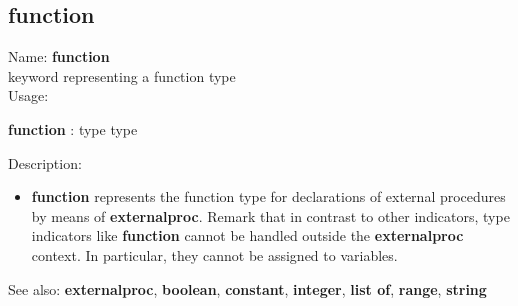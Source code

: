 \subsection{ function }
\noindent Name: \textbf{function}\\
keyword representing a \textsf{function} type \\

\noindent Usage: 
\begin{center}
\textbf{function} : \textsf{type type}\\
\end{center}
\noindent Description: \begin{itemize}

\item \textbf{function} represents the \textsf{function} type for declarations
   of external procedures by means of \textbf{externalproc}.
   Remark that in contrast to other indicators, type indicators like
   \textbf{function} cannot be handled outside the \textbf{externalproc} context.  In
   particular, they cannot be assigned to variables.
\end{itemize}
See also: \textbf{externalproc}, \textbf{boolean}, \textbf{constant}, \textbf{integer}, \textbf{list of}, \textbf{range}, \textbf{string}
